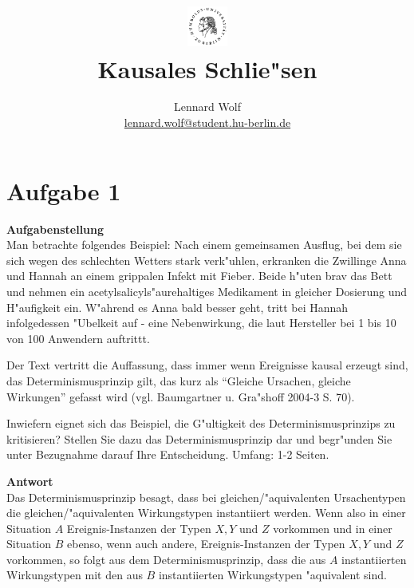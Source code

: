 \documentclass[a4paper]{article}
\date{\vspace{-3ex}}
\begin{document}
\title{
    \vspace{-30pt}
	\includegraphics*[width=0.1\textwidth,left]{ErstesSem/images/hu_logo2.png}\\
	\vspace{-10pt}
	Kausales Schlie"sen}
\author{Lennard Wolf\\
        \small{\href{mailto:lennard.wolf@student.hu-berlin.de}{lennard.wolf@student.hu-berlin.de}}}
\maketitle
\vspace{-4pt}

\section*{Aufgabe 1}
\large

\textbf{Aufgabenstellung}\\ Man betrachte folgendes Beispiel: Nach einem gemeinsamen Ausflug, bei dem sie sich wegen des schlechten Wetters stark verk"uhlen, erkranken die Zwillinge Anna und Hannah an einem grippalen Infekt mit Fieber. Beide h"uten brav das Bett und nehmen ein acetylsalicyls"aurehaltiges Medikament in gleicher Dosierung und H"aufigkeit ein. W"ahrend es Anna bald besser geht, tritt bei Hannah infolgedessen "Ubelkeit auf - eine Nebenwirkung, die laut Hersteller bei 1 bis 10 von 100 Anwendern auftrittt.

Der Text vertritt die Auffassung, dass immer wenn Ereignisse kausal erzeugt sind, das Determinismusprinzip gilt, das kurz als "`Gleiche Ursachen, gleiche Wirkungen"' gefasst wird (vgl. Baumgartner u. Gra"shoff 2004-3 S. 70).

Inwiefern eignet sich das Beispiel, die G"ultigkeit des Determinismusprinzips zu kritisieren? Stellen Sie dazu das Determinismusprinzip dar und begr"unden Sie unter Bezugnahme darauf Ihre Entscheidung. Umfang: 1-2 Seiten.\newline

\noindent \textbf{Antwort}\\ Das Determinismusprinzip besagt, dass bei gleichen/"aquivalenten Ursachentypen die gleichen/"aquivalenten Wirkungstypen instantiiert werden. Wenn also in einer Situation $A$ Ereignis-Instanzen der Typen $X, Y$ und $Z$ vorkommen und in einer Situation $B$ ebenso, wenn auch andere, Ereignis-Instanzen der Typen $X, Y$ und $Z$ vorkommen, so folgt aus dem Determinismusprinzip, dass die aus $A$ instantiierten Wirkungstypen mit den aus $B$ instantiierten Wirkungstypen "aquivalent sind.
\end{document}
